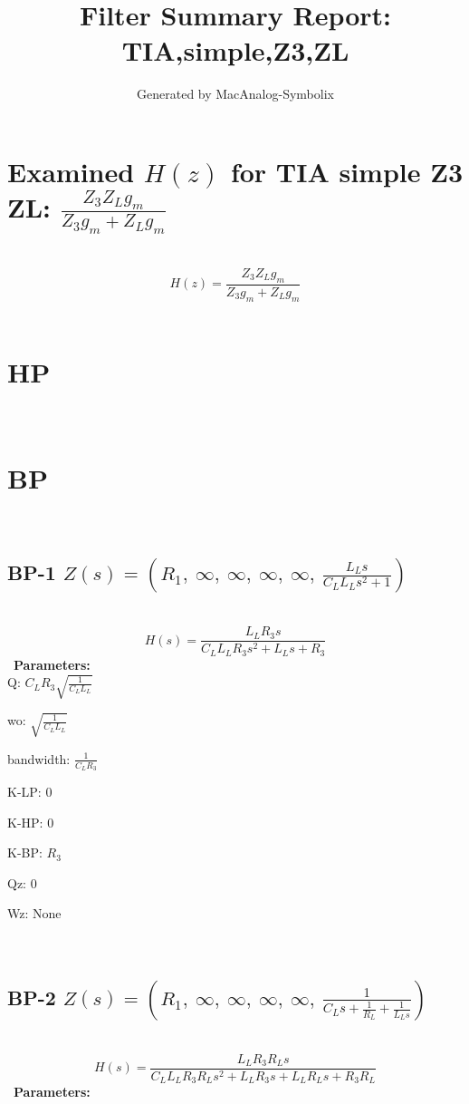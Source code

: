 \documentclass{article}
\begin{document}
        
                        \title{Filter Summary Report: TIA,simple,Z3,ZL}
                        \author{Generated by MacAnalog-Symbolix}
                        \maketitle

                        \tableofcontents
                        \newpage
                        \section{Examined $H(z)$ for TIA simple Z3 ZL: $\frac{Z_{3} Z_{L} g_{m}}{Z_{3} g_{m} + Z_{L} g_{m}}$ }\ 
\textbf{\[H(z) = \frac{Z_{3} Z_{L} g_{m}}{Z_{3} g_{m} + Z_{L} g_{m}}\] }\ 
\section{HP}\ 
\section{BP}\ 
\subsection{BP-1 $Z(s) = \left( R_{1}, \  \infty, \  \infty, \  \infty, \  \infty, \  \frac{L_{L} s}{C_{L} L_{L} s^{2} + 1}\right)$ } \ 
\textbf{\[H(s) = \frac{L_{L} R_{3} s}{C_{L} L_{L} R_{3} s^{2} + L_{L} s + R_{3}}\] } \ 
\textbf{Parameters:}\\ 

Q: $C_{L} R_{3} \sqrt{\frac{1}{C_{L} L_{L}}}$\ 

wo: $\sqrt{\frac{1}{C_{L} L_{L}}}$\ 

bandwidth: $\frac{1}{C_{L} R_{3}}$\ 

K-LP: $0$\ 

K-HP: $0$\ 

K-BP: $R_{3}$\ 

Qz: $0$\ 

Wz: $\text{None}$\ 

\ 

\subsection{BP-2 $Z(s) = \left( R_{1}, \  \infty, \  \infty, \  \infty, \  \infty, \  \frac{1}{C_{L} s + \frac{1}{R_{L}} + \frac{1}{L_{L} s}}\right)$ } \ 
\textbf{\[H(s) = \frac{L_{L} R_{3} R_{L} s}{C_{L} L_{L} R_{3} R_{L} s^{2} + L_{L} R_{3} s + L_{L} R_{L} s + R_{3} R_{L}}\] } \ 
\textbf{Parameters:}\\ 
\end{document}
